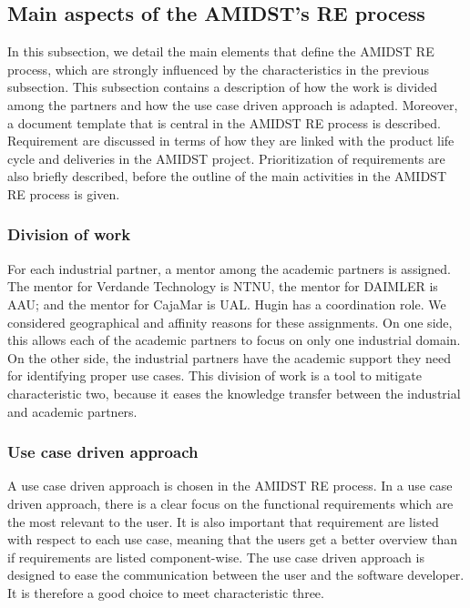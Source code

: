 \subsection{Main aspects of the AMIDST's RE process}
\label{sec:reprocess}

In this subsection, we detail the main elements that define the AMIDST RE process, which are strongly influenced by the characteristics in the previous subsection.  This subsection contains a description of how the work is divided among the partners and how the use case driven approach is adapted.  Moreover, a document template that is central in the AMIDST RE process is described.  Requirement are discussed in terms of how they are linked with the product life cycle and deliveries in the AMIDST project.  Prioritization of requirements are also briefly described, before the outline of the main activities in the AMIDST RE process is given.

\subsubsection*{Division of work}

For each industrial partner, a mentor among the academic partners is assigned. The mentor for Verdande Technology is NTNU, the mentor for DAIMLER is AAU; and the mentor for CajaMar is UAL. Hugin has a coordination role. We considered geographical and affinity reasons for these assignments.  On one side, this allows each of the academic partners to focus on only one industrial domain.  On the other side, the industrial partners have the academic support they need for identifying proper use cases.  This division of work is a tool to mitigate characteristic two, because it eases the knowledge transfer between the industrial and academic partners. 

\subsubsection*{Use case driven approach}

A use case driven approach is chosen in the AMIDST RE process.  In a use case driven approach, there is a clear focus on the functional requirements which are the most relevant to the user.  It is also important that requirement are listed with respect to each use case, meaning that the users get a better overview than if requirements are listed component-wise. The use case driven approach is designed to ease the communication between the user and the software developer.  It is therefore a good choice to meet characteristic three.  


